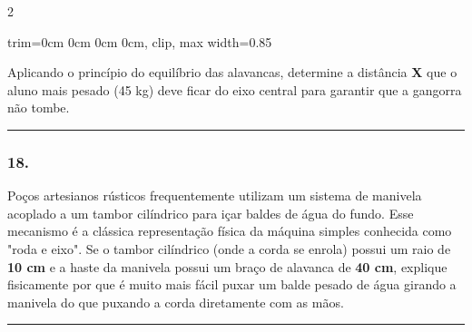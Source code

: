 \documentclass[twoside, 10pt, a4paper]{article}
\newlength{\espacoPreQuestao}\setlength{\espacoPreQuestao}{0.1cm}
\newlength{\espacoQuestao}\setlength{\espacoQuestao}{0.2cm}
\newcommand{\larguraTikz}{0.85\linewidth}
\begin{document}
\begin{multicols*}{2}
\begin{center}
\begin{adjustbox}{trim=0cm 0cm 0cm 0cm, clip, max width=\larguraTikz}
\end{adjustbox}
\end{center}
Aplicando o princípio do equilíbrio das alavancas, determine a distância \textbf{X} que o aluno mais pesado (45 kg) deve ficar do eixo central para garantir que a gangorra não tombe.
\par\vspace{\espacoQuestao}

\noindent\textcolor{CorLinha}{\rule{\linewidth}{0.5pt}} 
\par\vspace{\espacoPreQuestao}
\subsubsection*{18.} Poços artesianos rústicos frequentemente utilizam um sistema de manivela acoplado a um tambor cilíndrico para içar baldes de água do fundo. Esse mecanismo é a clássica representação física da máquina simples conhecida como "roda e eixo". Se o tambor cilíndrico (onde a corda se enrola) possui um raio de \textbf{10 cm} e a haste da manivela possui um braço de alavanca de \textbf{40 cm}, explique fisicamente por que é muito mais fácil puxar um balde pesado de água girando a manivela do que puxando a corda diretamente com as mãos.
\par\vspace{\espacoQuestao}

\noindent\textcolor{CorLinha}{\rule{\linewidth}{0.5pt}}
\par\vspace{\espacoPreQuestao}

\end{multicols*}
\end{document}
